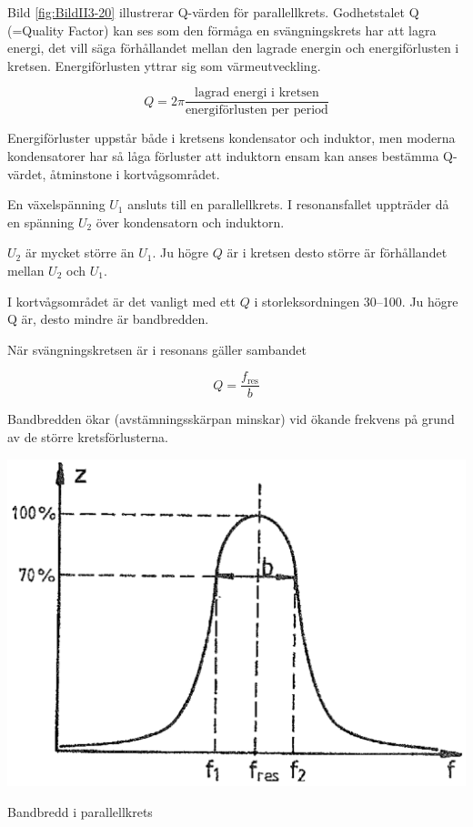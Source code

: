 Bild \ref{fig:BildII3-20} illustrerar Q-värden för parallellkrets.
Godhetstalet Q (=Quality Factor) kan ses som den förmåga en svängningskrets har
att lagra energi, det vill säga förhållandet mellan den lagrade energin och
energiförlusten i kretsen.
Energiförlusten yttrar sig som värmeutveckling.

\[
Q = 2\pi \frac{\text{lagrad energi i kretsen}}{\text{energiförlusten per period}}
\]

Energiförluster uppstår både i kretsens kondensator och induktor, men moderna
kondensatorer har så låga förluster att induktorn ensam kan anses bestämma
Q-värdet, åtminstone i kortvågsområdet.

En växelspänning \(U_1\) ansluts till en parallellkrets.
I resonansfallet uppträder då en spänning \(U_2\) över kondensatorn och
induktorn.

\(U_2\) är mycket större än \(U_1\).
Ju högre \(Q\) är i kretsen desto större är förhållandet mellan \(U_2\) och
\(U_1\).

I kortvågsområdet är det vanligt med ett \(Q\) i storleksordningen 30--100.
Ju högre Q är, desto mindre är bandbredden.

När svängningskretsen är i resonans gäller sambandet

\[ Q = \frac{f_{\text{res}}}{b} \]

Bandbredden ökar (avstämningsskärpan minskar) vid ökande frekvens på grund av de
större kretsförlusterna.

\begin{marginfigure}
	\includegraphics[width=\textwidth]{images/cropped_pdfs/bild_2_3-21.pdf}
	\caption{Bandbredd i parallellkrets}
	\label{fig:BildII3-21}
\end{marginfigure}

